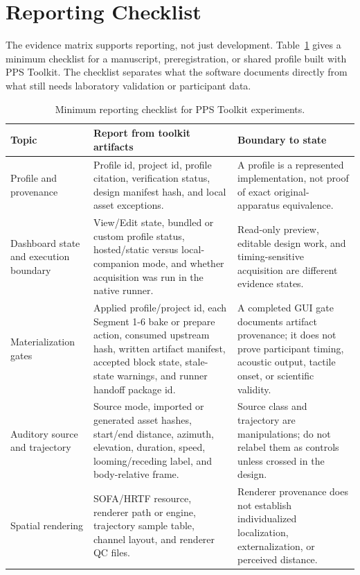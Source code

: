 \documentclass[pdflatex,sn-apa]{sn-jnl}
\newcommand{\toolkit}{PPS Toolkit}
\begin{document}
\section{Reporting Checklist}

The evidence matrix supports reporting, not just development. Table~\ref{tab:reporting} gives a minimum checklist for a manuscript, preregistration, or shared profile built with \toolkit{}. The checklist separates what the software documents directly from what still needs laboratory validation or participant data.

\begin{table}[t]
\caption{Minimum reporting checklist for PPS Toolkit experiments.}
\label{tab:reporting}
\footnotesize
\begin{tabularx}{\textwidth}{>{\raggedright\arraybackslash}p{} >{\raggedright\arraybackslash}X >{\raggedright\arraybackslash}p{}}
\toprule
Topic & Report from toolkit artifacts & Boundary to state \\
\midrule
Profile and provenance & Profile id, project id, profile citation, verification status, design manifest hash, and local asset exceptions. & A profile is a represented implementation, not proof of exact original-apparatus equivalence. \\
Dashboard state and execution boundary & View/Edit state, bundled or custom profile status, hosted/static versus local-companion mode, and whether acquisition was run in the native runner. & Read-only preview, editable design work, and timing-sensitive acquisition are different evidence states. \\
Materialization gates & Applied profile/project id, each Segment 1-6 bake or prepare action, consumed upstream hash, written artifact manifest, accepted block state, stale-state warnings, and runner handoff package id. & A completed GUI gate documents artifact provenance; it does not prove participant timing, acoustic output, tactile onset, or scientific validity. \\
Auditory source and trajectory & Source mode, imported or generated asset hashes, start/end distance, azimuth, elevation, duration, speed, looming/receding label, and body-relative frame. & Source class and trajectory are manipulations; do not relabel them as controls unless crossed in the design. \\
Spatial rendering & SOFA/HRTF resource, renderer path or engine, trajectory sample table, channel layout, and renderer QC files. & Renderer provenance does not establish individualized localization, externalization, or perceived distance. \\

\end{tabularx}
\end{table}
\end{document}
